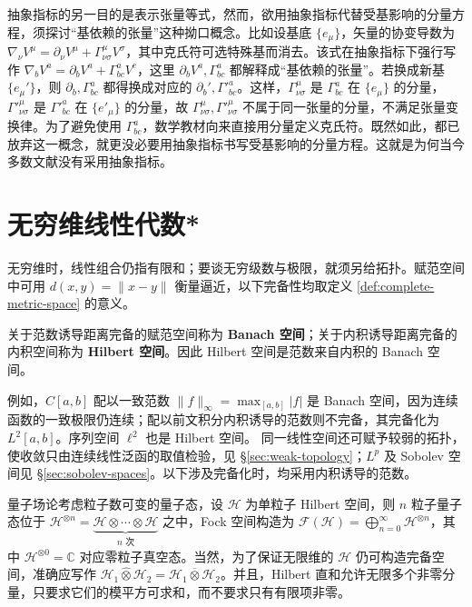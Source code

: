 抽象指标的另一目的是表示张量等式，然而，欲用抽象指标代替受基影响的分量方程，须探讨“基依赖的张量”这种拗口概念。比如设基底 $\{e_\mu\}$，矢量的协变导数为 $\nabla_\nu V^\mu =\partial_\nu{V^\mu}+\Gamma^\mu_{\nu\sigma}V^\sigma$，其中克氏符可选特殊基而消去。该式在抽象指标下强行写作 $\nabla_b V^a =\partial_b{V^a}+\Gamma^a_{bc}V^c$，这里 $\partial_b{V^a},\Gamma^a_{bc}$ 都解释成“基依赖的张量”。若换成新基 $\{e_\mu'\}$，则 $\partial_b,\Gamma^a_{bc}$ 都得换成对应的 $\partial_b',\Gamma'^a_{bc}$。这样，$\Gamma^\mu_{\nu\sigma}$ 是 $\Gamma^a_{bc}$ 在 $\{e_\mu\}$ 的分量，$\Gamma'^\mu_{\nu\sigma}$ 是 $\Gamma'^a_{bc}$ 在 $\{e'_\mu\}$ 的分量，故 $\Gamma^\mu_{\nu\sigma},\Gamma'^\mu_{\nu\sigma}$ 不属于同一张量的分量，不满足张量变换律。为了避免使用 $\Gamma^a_{bc}$，数学教材向来直接用分量定义克氏符。既然如此，都已放弃这一概念，就更没必要用抽象指标书写受基影响的分量方程。这就是为何当今多数文献没有采用抽象指标。

\section{无穷维线性代数*}\label{sec:infinite}

无穷维时，线性组合仍指有限和；要谈无穷级数与极限，就须另给拓扑。赋范空间中可用 $d(x,y)=\|x-y\|$ 衡量逼近，以下完备性均取定义 \ref{def:complete-metric-space} 的意义。

\begin{definition}\label{def:banach-hilbert}
    关于范数诱导距离完备的赋范空间称为 \textbf{Banach 空间}；关于内积诱导距离完备的内积空间称为 \textbf{Hilbert 空间}。因此 Hilbert 空间是范数来自内积的 Banach 空间。
\end{definition}

例如，$C[a,b]$ 配以一致范数 $\|f\|_\infty=\max_{[a,b]}|f|$ 是 Banach 空间，因为连续函数的一致极限仍连续；配以前文积分内积诱导的范数则不完备，其完备化为 $L^2[a,b]$。序列空间 $\ell^2$ 也是 Hilbert 空间。
同一线性空间还可赋予较弱的拓扑，使收敛只由连续线性泛函的取值检验，见 \S\ref{sec:weak-topology}；$L^p$ 及 Sobolev 空间见 \S\ref{sec:sobolev-spaces}。以下涉及完备化时，均采用内积诱导的范数。

量子场论考虑粒子数可变的量子态，设 $\mathscr H$ 为单粒子 Hilbert 空间，则 $n$ 粒子量子态位于 $\mathscr H^{\otimes n}=\underbrace{\mathscr H\otimes\cdots\otimes\mathscr H}_{n\text{ 次}}$ 之中，Fock 空间构造为 $\mathscr F(\mathscr H)=\bigoplus_{n=0}^{\infty}\mathscr H^{ \otimes n}$，其中 \(\mathscr H^{\otimes0}=\mathbb C\) 对应零粒子真空态。当然，为了保证无限维的 $\mathscr H$ 仍可构造完备空间，准确应写作 $\mathscr H_1\widehat\otimes\mathscr H_2=\overline{\mathscr H_1\otimes\mathscr H_2}$。并且，Hilbert 直和允许无限多个非零分量，只要求它们的模平方可求和，而不要求只有有限项非零。

